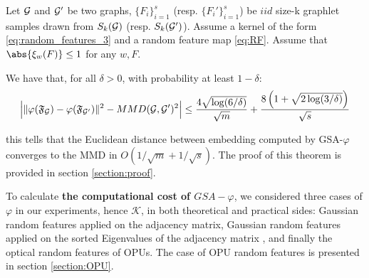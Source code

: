 \begin{theorem}
\label{theorem:concentration}
Let $\mathcal{G}$ and $\mathcal{G}'$ be two graphs, $\{F_i\}_{i=1}^{s}$ (resp. $\{F_i'\}_{i=1}^{s}$) be $iid$ size-k graphlet samples drawn from $S_k(\mathcal{G})$ (resp. $S_k(\mathcal{G}')$). Assume a kernel of the form \eqref{eq:random_features_3} and a random feature map \eqref{eq:RF}. Assume that $\abs{\xi_w(F)} \leq 1$ for any $w,F$.

We have that, for all $\delta>0$, with probability at least $1-\delta$:
\begin{align*}
 \Big|\|\varphi(\mathfrak{F}_{\mathcal{G}}) - \varphi(\mathfrak{F}_{\mathcal{G}'})\|^2 - MMD(\mathcal{G},\mathcal{G}')^2 \Big| \leq \frac{4 \sqrt{\log (6/\delta)}}{\sqrt{m}} + \frac{8\left(1+\sqrt{2\log(3/\delta)}\right)}{\sqrt{{s}}}
\end{align*}
\end{theorem}
this tells that the Euclidean distance between embedding computed by GSA-$\varphi$ converges to the MMD in $O(1/\sqrt{m} + 1/\sqrt{s})$. The proof of this theorem is provided in section \ref{section:proof}.

To calculate \textbf{the computational cost of $GSA-\varphi$}, we considered three cases of $\varphi$ in our experiments, hence $\mathcal{K}$, in both theoretical and practical sides: Gaussian random features applied on the adjacency matrix, Gaussian random features applied on the sorted Eigenvalues of the adjacency matrix , and finally the optical random features of OPUs. The case of OPU random features is presented in section \ref{section:OPU}.\newline
{}



